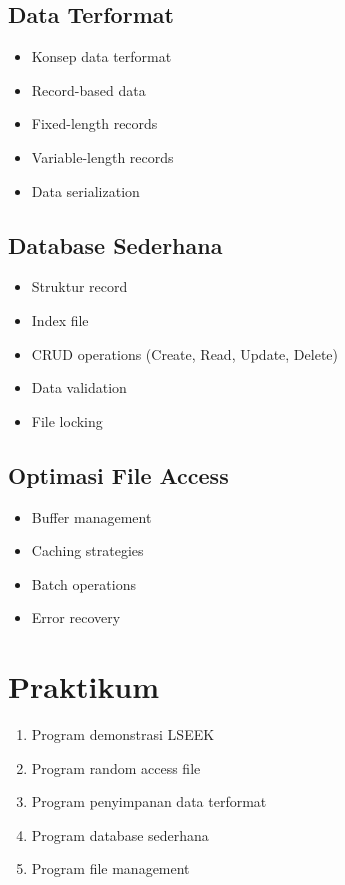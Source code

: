 \subsection{Data Terformat}
\begin{itemize}
\item Konsep data terformat
\item Record-based data
\item Fixed-length records
\item Variable-length records
\item Data serialization
\end{itemize}

\subsection{Database Sederhana}
\begin{itemize}
\item Struktur record
\item Index file
\item CRUD operations (Create, Read, Update, Delete)
\item Data validation
\item File locking
\end{itemize}

\subsection{Optimasi File Access}
\begin{itemize}
\item Buffer management
\item Caching strategies
\item Batch operations
\item Error recovery
\end{itemize}

\section{Praktikum}
\begin{enumerate}
\item Program demonstrasi LSEEK
\item Program random access file
\item Program penyimpanan data terformat
\item Program database sederhana
\item Program file management
\end{enumerate}

